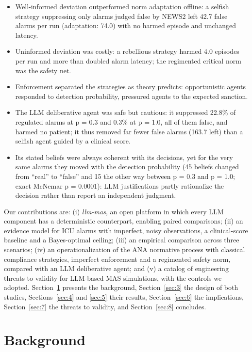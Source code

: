 \documentclass{ieeeaccess}
\begin{document}
\begin{itemize}
\item Well-informed deviation outperformed norm adaptation offline: a selfish strategy suppressing only alarms judged false by NEWS2 left 42.7 false alarms per run (adaptation: 74.0) with no harmed episode and unchanged latency.
\item Uninformed deviation was costly: a rebellious strategy harmed 4.0 episodes per run and more than doubled alarm latency; the regimented critical norm was the safety net.
\item Enforcement separated the strategies as theory predicts: opportunistic agents responded to detection probability, pressured agents to the expected sanction.
\item The LLM deliberative agent was safe but cautious: it suppressed 22.8\% of regulated alarms at p = 0.3 and 0.3\% at p = 1.0, all of them false, and harmed no patient; it thus removed far fewer false alarms (163.7 left) than a selfish agent guided by a clinical score.
\item Its stated beliefs were always coherent with its decisions, yet for the very same alarms they moved with the detection probability (45 beliefs changed from ``real'' to ``false'' and 15 the other way between p = 0.3 and p = 1.0; exact McNemar p = 0.0001): LLM justifications partly rationalize the decision rather than report an independent judgment.
\end{itemize}

Our contributions are: (i) \emph{llm-mas}, an open platform in which every LLM component has a deterministic counterpart, enabling paired comparisons; (ii) an evidence model for ICU alarms with imperfect, noisy observations, a clinical-score baseline and a Bayes-optimal ceiling; (iii) an empirical comparison across three scenarios; (iv) an operationalization of the ANA normative process with classical compliance strategies, imperfect enforcement and a regimented safety norm, compared with an LLM deliberative agent; and (v) a catalog of engineering threats to validity for LLM-based MAS simulations, with the controls we adopted. Section~\ref{sec:2} presents the background, Section~\ref{sec:3} the design of both studies, Sections~\ref{sec:4} and \ref{sec:5} their results, Section~\ref{sec:6} the implications, Section~\ref{sec:7} the threats to validity, and Section~\ref{sec:8} concludes.

\section{Background}\label{sec:2}
\end{document}
